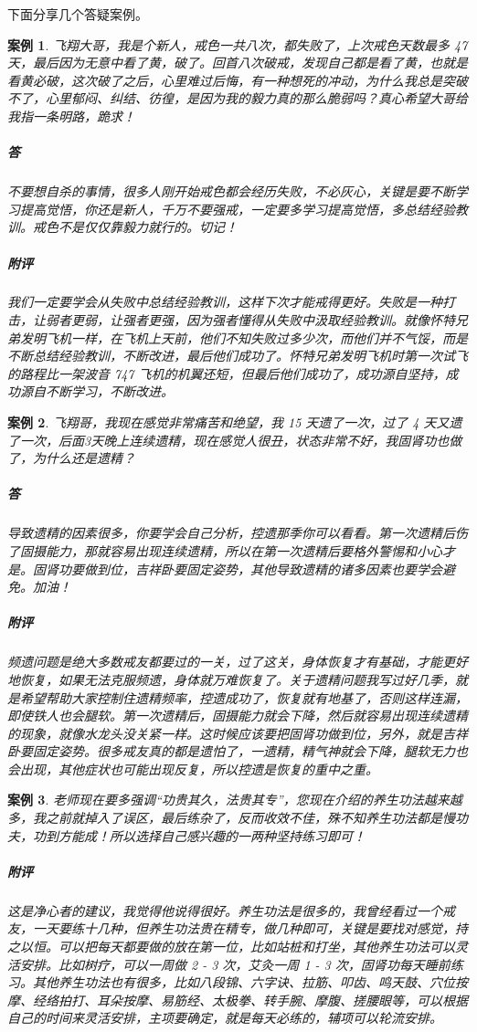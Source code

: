\documentclass{ctexart}
\newtheorem{case}{案例}
\begin{document}
下面分享几个答疑案例。

\begin{case}
    飞翔大哥，我是个新人，戒色一共八次，都失败了，上次戒色天数最多 47 天，最后因为无意中看了黄，破了。回首八次破戒，发现自己都是看了黄，也就是看黄必破，这次破了之后，心里难过后悔，有一种想死的冲动，为什么我总是突破不了，心里郁闷、纠结、彷徨，是因为我的毅力真的那么脆弱吗？真心希望大哥给我指一条明路，跪求！
    \subparagraph{答} 不要想自杀的事情，很多人刚开始戒色都会经历失败，不必灰心，关键是要不断学习提高觉悟，你还是新人，千万不要强戒，一定要多学习提高觉悟，多总结经验教训。戒色不是仅仅靠毅力就行的。切记！
    \subparagraph{附评} 我们一定要学会从失败中总结经验教训，这样下次才能戒得更好。失败是一种打击，让弱者更弱，让强者更强，因为强者懂得从失败中汲取经验教训。就像怀特兄弟发明飞机一样，在飞机上天前，他们不知失败过多少次，而他们并不气馁，而是不断总结经验教训，不断改进，最后他们成功了。怀特兄弟发明飞机时第一次试飞的路程比一架波音 747 飞机的机翼还短，但最后他们成功了，成功源自坚持，成功源自不断学习，不断改进。
\end{case}

\begin{case}
    飞翔哥，我现在感觉非常痛苦和绝望，我 15 天遗了一次，过了 4 天又遗了一次，后面3天晚上连续遗精，现在感觉人很丑，状态非常不好，我固肾功也做了，为什么还是遗精？
    \subparagraph{答} 导致遗精的因素很多，你要学会自己分析，控遗那季你可以看看。第一次遗精后伤了固摄能力，那就容易出现连续遗精，所以在第一次遗精后要格外警惕和小心才是。固肾功要做到位，吉祥卧要固定姿势，其他导致遗精的诸多因素也要学会避免。加油！
    \subparagraph{附评} 频遗问题是绝大多数戒友都要过的一关，过了这关，身体恢复才有基础，才能更好地恢复，如果无法克服频遗，身体就万难恢复了。关于遗精问题我写过好几季，就是希望帮助大家控制住遗精频率，控遗成功了，恢复就有地基了，否则这样连漏，即使铁人也会腿软。第一次遗精后，固摄能力就会下降，然后就容易出现连续遗精的现象，就像水龙头没关紧一样。这时候应该要把固肾功做到位，另外，就是吉祥卧要固定姿势。很多戒友真的都是遗怕了，一遗精，精气神就会下降，腿软无力也会出现，其他症状也可能出现反复，所以控遗是恢复的重中之重。
\end{case}

\begin{case}
    老师现在要多强调“功贵其久，法贵其专”，您现在介绍的养生功法越来越多，我之前就掉入了误区，最后练杂了，反而收效不佳，殊不知养生功法都是慢功夫，功到方能成！所以选择自己感兴趣的一两种坚持练习即可！
    \subparagraph{附评} 这是净心者的建议，我觉得他说得很好。养生功法是很多的，我曾经看过一个戒友，一天要练十几种，但养生功法贵在精专，做几种即可，关键是要找对感觉，持之以恒。可以把每天都要做的放在第一位，比如站桩和打坐，其他养生功法可以灵活安排。比如树疗，可以一周做 2 - 3 次，艾灸一周 1 - 3 次，固肾功每天睡前练习。其他养生功法也有很多，比如八段锦、六字诀、拉筋、叩齿、鸣天鼓、穴位按摩、经络拍打、耳朵按摩、易筋经、太极拳、转手腕、摩腹、搓腰眼等，可以根据自己的时间来灵活安排，主项要确定，就是每天必练的，辅项可以轮流安排。
\end{case}
\end{document}
